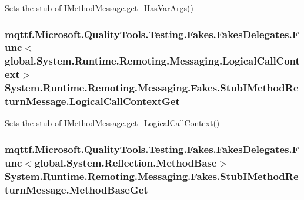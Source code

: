 Sets the stub of I\-Method\-Message.\-get\-\_\-\-Has\-Var\-Args()

\hypertarget{class_system_1_1_runtime_1_1_remoting_1_1_messaging_1_1_fakes_1_1_stub_i_method_return_message_a7e20e3bb4ca4a5c70ecf99c5d395ccbf}{
\subsubsection[{Logical\-Call\-Context\-Get}]{\setlength{\rightskip}{0pt plus 5cm}mqttf.\-Microsoft.\-Quality\-Tools.\-Testing.\-Fakes.\-Fakes\-Delegates.\-Func$<$global.\-System.\-Runtime.\-Remoting.\-Messaging.\-Logical\-Call\-Context$>$ System.\-Runtime.\-Remoting.\-Messaging.\-Fakes.\-Stub\-I\-Method\-Return\-Message.\-Logical\-Call\-Context\-Get}}\label{class_system_1_1_runtime_1_1_remoting_1_1_messaging_1_1_fakes_1_1_stub_i_method_return_message_a7e20e3bb4ca4a5c70ecf99c5d395ccbf}


Sets the stub of I\-Method\-Message.\-get\-\_\-\-Logical\-Call\-Context()

\hypertarget{class_system_1_1_runtime_1_1_remoting_1_1_messaging_1_1_fakes_1_1_stub_i_method_return_message_af3206f2a8a3172be2309c66e6f7100be}{
\subsubsection[{Method\-Base\-Get}]{\setlength{\rightskip}{0pt plus 5cm}mqttf.\-Microsoft.\-Quality\-Tools.\-Testing.\-Fakes.\-Fakes\-Delegates.\-Func$<$global.\-System.\-Reflection.\-Method\-Base$>$ System.\-Runtime.\-Remoting.\-Messaging.\-Fakes.\-Stub\-I\-Method\-Return\-Message.\-Method\-Base\-Get}}\label{class_system_1_1_runtime_1_1_remoting_1_1_messaging_1_1_fakes_1_1_stub_i_method_return_message_af3206f2a8a3172be2309c66e6f7100be}


